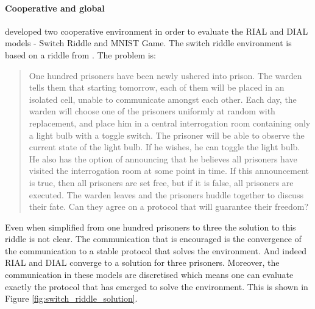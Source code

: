 \documentclass{article}
\begin{document}
\paragraph{Cooperative and global}

\citet{foerster2016learning} developed two cooperative environment in order to evaluate the RIAL and DIAL models - Switch Riddle and MNIST Game. The switch riddle environment is based on a riddle from \citet{wu2002prisoners}. The problem is:

\begin{quote}
One hundred prisoners have been newly ushered into prison. The warden tells them that starting tomorrow, each of them will be placed in an isolated cell, unable to communicate amongst each other. Each day, the warden will choose one of the prisoners uniformly at random with replacement, and place him in a central interrogation room containing only a light bulb with a toggle switch. The prisoner will be able to observe the current state of the light bulb. If he wishes, he can toggle the light bulb. He also has the option of announcing that he believes all prisoners have visited the interrogation room at some point in time. If this announcement is true, then all prisoners are set free, but if it is false, all prisoners are executed. The warden leaves and the prisoners huddle together to discuss their fate. Can they agree on a protocol that will guarantee their freedom?
\end{quote}

Even when simplified from one hundred prisoners to three the solution to this riddle is not clear. The communication that is encouraged is the convergence of the communication to a stable protocol that solves the environment. And indeed RIAL and DIAL converge to a solution for three prisoners. Moreover, the communication in these models are discretised which means one can evaluate exactly the protocol that has emerged to solve the environment. This is shown in Figure \ref{fig:switch_riddle_solution}.

\
\end{document}
